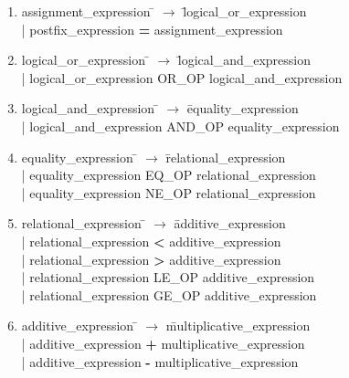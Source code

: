 \documentclass[11pt]{article}
\begin{document}
\begin{enumerate}
\item \begin{tabbing} assignment{\_}expression \= $\to$ \= logical{\_}or{\_}expression \\
	\> | \> postfix{\_}expression \textbf{=} assignment{\_}expression
\end{tabbing}

\item \begin{tabbing} logical{\_}or{\_}expression \= $\to$ \= logical{\_}and{\_}expression \\
	\> | \> logical{\_}or{\_}expression OR{\_}OP logical{\_}and{\_}expression
\end{tabbing}

\item \begin{tabbing} logical{\_}and{\_}expression \= $\to$ \= equality{\_}expression \\
	\> | \> logical{\_}and{\_}expression AND{\_}OP equality{\_}expression
\end{tabbing}

\item \begin{tabbing} equality{\_}expression \= $\to$ \= relational{\_}expression \\
	\> | \> equality{\_}expression EQ{\_}OP relational{\_}expression \\
	\> | \> equality{\_}expression NE{\_}OP relational{\_}expression
\end{tabbing}

\item \begin{tabbing} relational{\_}expression \= $\to$ \= additive{\_}expression \\
	\> | \> relational{\_}expression \textbf{<} additive{\_}expression \\
	\> | \> relational{\_}expression \textbf{>} additive{\_}expression \\
	\> | \> relational{\_}expression LE{\_}OP additive{\_}expression \\
	\> | \> relational{\_}expression GE{\_}OP additive{\_}expression
\end{tabbing}

\item \begin{tabbing} additive{\_}expression \= $\to$ \= multiplicative{\_}expression \\
	\> | \> additive{\_}expression \textbf{+} multiplicative{\_}expression \\
	\> | \> additive{\_}expression \textbf{-} multiplicative{\_}expression
\end{tabbing}


\end{enumerate}
\end{document}
